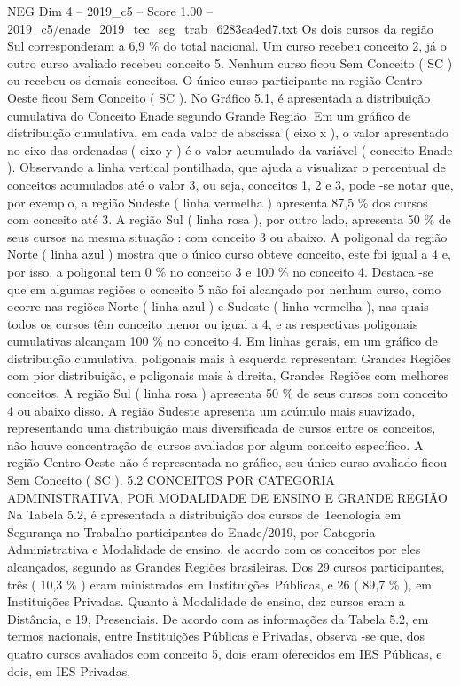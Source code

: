 \begin{textsample}{NEG Dim 4 – 2019\_c5 – Score 1.00 – 2019\_c5/enade\_2019\_tec\_seg\_trab\_6283ea4ed7.txt}
Os dois cursos da região Sul corresponderam a 6,9 \% do total nacional.
Um curso recebeu conceito 2, já o outro curso avaliado recebeu conceito 5.
Nenhum curso ficou Sem Conceito ( SC ) ou recebeu os demais conceitos.
O único curso participante na região Centro-Oeste ficou Sem Conceito ( SC ).
No Gráfico 5.1, é apresentada a distribuição cumulativa do Conceito Enade segundo Grande Região.
Em um gráfico de distribuição cumulativa, em cada valor de abscissa ( eixo x ), o valor apresentado no eixo das ordenadas ( eixo y ) é o valor acumulado da variável ( conceito Enade ).
Observando a linha vertical pontilhada, que ajuda a visualizar o percentual de conceitos acumulados até o valor 3, ou seja, conceitos 1, 2 e 3, pode -se notar que, por exemplo, a região Sudeste ( linha vermelha ) apresenta 87,5 \% dos cursos com conceito até 3.
A região Sul ( linha rosa ), por outro lado, apresenta 50 \% de seus cursos na mesma situação : com conceito 3 ou abaixo.
A poligonal da região Norte ( linha azul ) mostra que o único curso obteve conceito, este foi igual a 4 e, por isso, a poligonal tem 0 \% no conceito 3 e 100 \% no conceito 4.
Destaca -se que em algumas regiões o conceito 5 não foi alcançado por nenhum curso, como ocorre nas regiões Norte ( linha azul ) e Sudeste ( linha vermelha ), nas quais todos os cursos têm conceito menor ou igual a 4, e as respectivas poligonais cumulativas alcançam 100 \% no conceito 4.
Em linhas gerais, em um gráfico de distribuição cumulativa, poligonais mais à esquerda representam Grandes Regiões com pior distribuição, e poligonais mais à direita, Grandes Regiões com melhores conceitos.
A região Sul ( linha rosa ) apresenta 50 \% de seus cursos com conceito 4 ou abaixo disso.
A região Sudeste apresenta um acúmulo mais suavizado, representando uma distribuição mais diversificada de cursos entre os conceitos, não houve concentração de cursos avaliados por algum conceito específico.
A região Centro-Oeste não é representada no gráfico, seu único curso avaliado ficou Sem Conceito ( SC ). 5.2 CONCEITOS POR CATEGORIA ADMINISTRATIVA, POR MODALIDADE DE ENSINO E GRANDE REGIÃO Na Tabela 5.2, é apresentada a distribuição dos cursos de Tecnologia em Segurança no Trabalho participantes do Enade/2019, por Categoria Administrativa e Modalidade de ensino, de acordo com os conceitos por eles alcançados, segundo as Grandes Regiões brasileiras.
Dos 29 cursos participantes, três ( 10,3 \% ) eram ministrados em Instituições Públicas, e 26 ( 89,7 \% ), em Instituições Privadas.
Quanto à Modalidade de ensino, dez cursos eram a Distância, e 19, Presenciais.
De acordo com as informações da Tabela 5.2, em termos nacionais, entre Instituições Públicas e Privadas, observa -se que, dos quatro cursos avaliados com conceito 5, dois eram oferecidos em IES Públicas, e dois, em IES Privadas.

\end{textsample}
